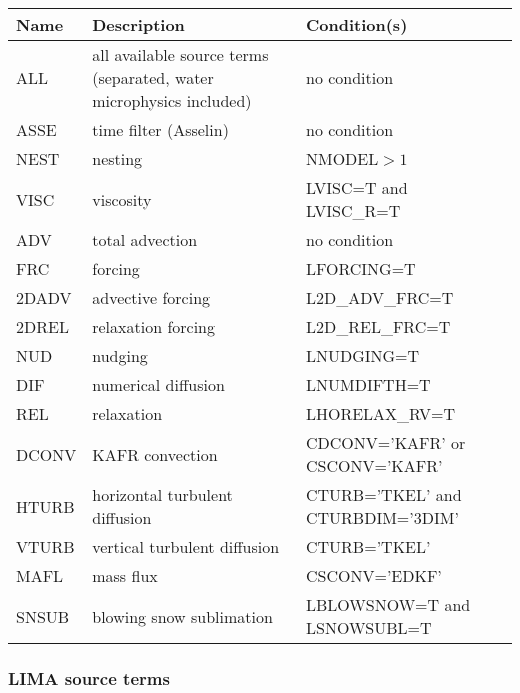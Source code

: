 \begin{longtable} {|p{}|p{}|p{}|}
\hline
Name & Description & Condition(s) \\
\hline \hline
\endhead
ALL    & all available source terms (separated,  water microphysics included) & no condition \\\hline \hline
ASSE   & time filter (Asselin)          & no condition                     \\\hline
NEST   & nesting                        & NMODEL$>1$                       \\\hline
VISC   & viscosity                      & LVISC=T and LVISC\_R=T           \\\hline
ADV    & total advection                & no condition                     \\\hline
FRC    & forcing                        & LFORCING=T                       \\\hline
2DADV  & advective forcing              & L2D\_ADV\_FRC=T                  \\\hline
2DREL  & relaxation forcing             & L2D\_REL\_FRC=T                  \\\hline
NUD    & nudging                        & LNUDGING=T                       \\\hline
DIF    & numerical diffusion            & LNUMDIFTH=T                      \\\hline
REL    & relaxation                     & LHORELAX\_RV=T                   \\\hline
DCONV  & KAFR convection                & CDCONV='KAFR' or CSCONV='KAFR'   \\\hline
HTURB  & horizontal turbulent diffusion & CTURB='TKEL' and CTURBDIM='3DIM' \\\hline
VTURB  & vertical turbulent diffusion   & CTURB='TKEL'                     \\\hline
MAFL   & mass flux                      & CSCONV='EDKF'                    \\\hline
SNSUB  & blowing snow sublimation       & LBLOWSNOW=T and LSNOWSUBL=T      \\\hline
\end{longtable}

\subsubsection{LIMA source terms}

